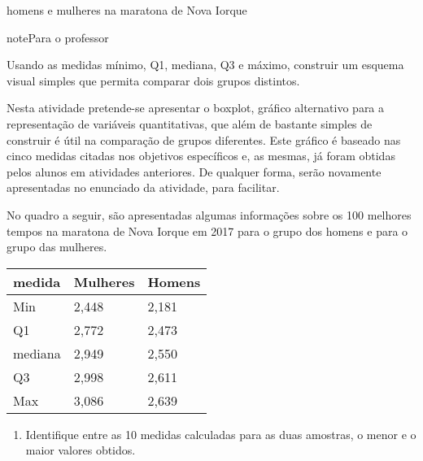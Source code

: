 \begin{task}{homens e mulheres na maratona de Nova Iorque}
\label{\detokenize{PE104-6:atividade-homens-e-mulheres-na-maratona-de-nova-iorque}}\label{\detokenize{PE104-6:ativ-construcao-do-boxplot}}
\begin{sphinxadmonition}{note}{Para o professor}

 Usando as medidas mínimo, Q1, mediana, Q3 e máximo, construir um esquema visual simples que permita comparar dois grupos distintos.

 Nesta atividade pretende-se apresentar o boxplot, gráfico alternativo para a representação de variáveis quantitativas, que além de bastante simples de construir é útil na comparação de grupos diferentes. Este gráfico é baseado nas cinco medidas citadas nos objetivos específicos e, as mesmas, já foram obtidas pelos alunos em atividades anteriores. De qualquer forma, serão novamente apresentadas no enunciado da atividade, para facilitar.
\end{sphinxadmonition}

No quadro a seguir, são apresentadas algumas informações sobre os 100 melhores tempos na maratona de Nova Iorque em 2017 para o grupo dos homens e para o grupo das mulheres.


\begin{savenotes}\sphinxattablestart
\centering
{}
\label{\detokenize{PE104-6:id1}}
\sphinxaftercaption
\begin{tabulary}{\linewidth}[t]{|T|T|T|}
\hline

medida
&
Mulheres
&
Homens
\\
\hline
Min
&
2,448
&
2,181
\\
\hline
Q1
&
2,772
&
2,473
\\
\hline
mediana
&
2,949
&
2,550
\\
\hline
Q3
&
2,998
&
2,611
\\
\hline
Max
&
3,086
&
2,639
\\
\hline
\end{tabulary}
\par
\sphinxattableend\end{savenotes}
\begin{enumerate}
\item {} 
Identifique entre as 10 medidas calculadas para as duas amostras, o menor e o maior valores obtidos.


\end{enumerate}
\end{task}
